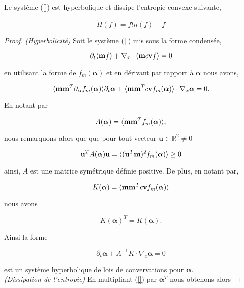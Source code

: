\begin{theorem}
  Le système (\ref{}) est hyperbolique et dissipe l'entropie convexe suivante,

  $$
    \tilde{H}(f) = fln(f) - f
  $$
\end{theorem}

\begin{proof} 
  \textit{(Hyperbolicité)}
  Soit le système (\ref{}) mis sous la forme condensée,

  \begin{equation}
    \partial_t \langle \mathbf{m} f \rangle + \nabla_x \cdot \langle \mathbf{m} c \mathbf{v} f \rangle = 0
  \end{equation}

  en utilisant la forme de $f_m(\bm{\alpha})$ et en dérivant par rapport à 
  $\bm{\alpha}$ nous avons,


  \begin{equation}
    \langle \mathbf{m} \mathbf{m}^T \partial_{\bm{\alpha}} f_m(\bm{\alpha}) \rangle \partial_t 
    \bm{\alpha} +  \langle \mathbf{m} \mathbf{m}^T c \mathbf{v} f_m(\bm{\alpha}) \rangle  \cdot \nabla_x  
    \bm{\alpha}  = 0.
  \end{equation}



  En notant par

  $$
    A(\bm{\alpha}) = \langle \mathbf{m} \mathbf{m}^T f_m(\bm{\alpha}) \rangle, 
  $$


  nous remarquons alors que que pour tout vecteur
  $\mathbf{u} \in \mathbb{R}^2 \neq 0$

  $$ 
    \mathbf{u}^T A(\bm{\alpha}) \mathbf{u} = \langle (\mathbf{u}^T \mathbf{m})^2 
    f_m(\bm{\alpha}) \rangle \geq 0 
  $$

  ainsi, $A$ est une matrice symétrique définie positive. De plus, en notant par,

  $$
    K(\bm{\alpha}) =  \langle \mathbf{m} \mathbf{m}^T c \mathbf{v} f_m(\bm{\alpha}) \rangle
  $$

  nous avons

  $$
    K(\bm{\alpha})^T = K(\bm{\alpha}).
  $$

  Ainsi la forme 

  $$ 
    \partial_t \bm{\alpha} + A^{-1}K \cdot \nabla_x  \bm{\alpha}  = 0 
  $$

  est un système hyperbolique de lois de convervations pour 
  $\bm{\bm{\alpha}}$.\\

  \textit{(Dissipation de l'entropie)} En multipliant (\ref{}) par 
  $\bm{\alpha}^T$ nous obtenons alors



\end{proof}
